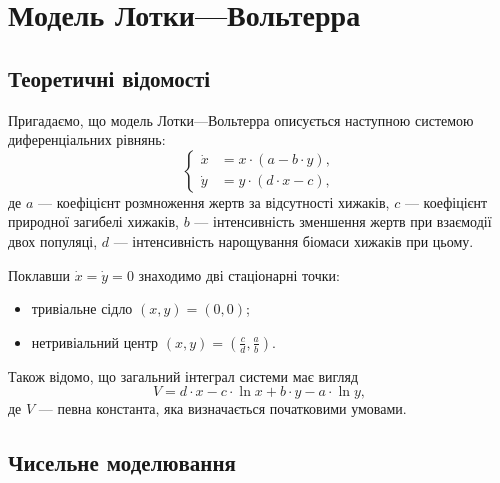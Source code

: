 




\tableofcontents

\section{Модель Лотки---Вольтерра}

\subsection{Теоретичні відомості}

Пригадаємо, що модель Лотки---Вольтерра описується наступною системою диференціальних рівнянь:
\begin{equation}
	\left\{
		\begin{aligned}
			\dot x &= x \cdot (a - b \cdot y), \\
			\dot y &= y \cdot (d \cdot x - c),
		\end{aligned}
	\right.
\end{equation}
де $a$ --- коефіцієнт розмноження жертв за відсутності хижаків, $c$ --- коефіцієнт природної загибелі хижаків, $b$ --- інтенсивність зменшення жертв при взаємодії двох популяці, $d$ --- інтенсивність нарощування біомаси хижаків при цьому. \medskip

Поклавши $\dot x = \dot y = 0$ знаходимо дві стаціонарні точки: 
\begin{itemize}
	\item тривіальне сідло $(x, y) = (0, 0)$;
	\item нетривіальний центр $(x, y) = \left(\frac{c}{d}, \frac{a}{b}\right)$.
\end{itemize}

Також відомо, що загальний інтеграл системи має вигляд
\begin{equation}
	V = d \cdot x - c \cdot \ln x + b \cdot y - a \cdot \ln y,
\end{equation}
де $V$ --- певна константа, яка визначається початковими умовами.

\subsection{Чисельне моделювання}

